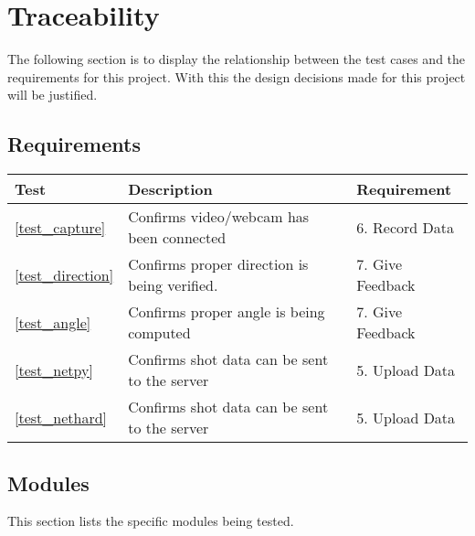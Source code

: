 \chapter{Traceability}
The following section is to display the relationship between the test cases and the requirements for this project. With this the design decisions made for this project will be justified. 

\setlength{\parindent}{0cm}

\section {Requirements} \label{41_req}

\begin{center}
\begin{tabular}{| l | l | l |}
    
    \hline 
    \textbf{Test}            & \textbf{Description}      & \textbf{Requirement} \\
    \hline
    \ref{test_capture}     &  Confirms video/webcam has been connected      & 6. Record Data    \\
    \hline 
    \ref{test_direction}       &  Confirms proper direction is being verified.  & 7. Give Feedback  \\
    \hline 
    \ref{test_angle}          &  Confirms proper angle is being computed       & 7. Give Feedback  \\
    \hline  
    \ref{test_netpy}   &  Confirms shot data can be sent to the server  & 5. Upload Data  \\
    \hline   
    \ref{test_nethard} &  Confirms shot data can be sent to the server  & 5. Upload Data  \\
    \hline 
   
\end{tabular}
\end{center}

\section {Modules} \label{42_mod}
This section lists the specific modules being tested.

